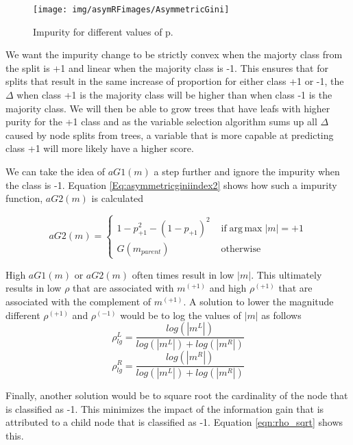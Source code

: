 \begin{figure}
 \centering
\texttt{[image: img/asymRFimages/AsymmetricGini]}\\
 \caption{Impurity for different values of p.}
 \label{Fig:Quantile Regression}
\end{figure}

We want the impurity change to be strictly convex when the majorty class from the split is +1 and linear when the majority class is -1. This ensures that for splits that result in the same increase of proportion for either class +1 or -1, the $\Delta$ when class +1 is the majority class will be higher than when class -1 is the majority class. We will then be able to grow trees that have leafs with higher purity for the +1 class and as the variable selection algorithm sums up all $\Delta$ caused by node splits from trees, a variable that is more capable at predicting class +1 will more likely have a higher score. 

We can take the idea of $aG1(m)$ a step further and ignore the impurity when the class is -1. Equation \ref{Eq:asymmetricginiindex2} shows how such a impurity function, $aG2(m)$ is calculated

\begin{equation}\label{Eq:asymmetricginiindex2}
aG2(m)=
\begin{cases} 1-p_{+1}^2-(1-p_{+1})^2 & \text{ if} \operatorname{arg\,max} |m| = +1 
\\ G(m_{parent})&\text{ otherwise}
\end{cases}
\end{equation}

High $aG1(m)$ or $aG2(m)$ often times result in low $|m|$. This ultimately results in low $\rho$ that are associated with $m^{(+1)}$ and high $\rho^{(+1)}$ that are associated with the complement of $m^{(+1)}$. A solution to lower the magnitude different $\rho^{(+1)}$  and $\rho^{(-1)}$ would be to log the values of $|m|$ as follows
\begin{equation}\label{eqn:rho_log}
	\rho_{lg}^L = \frac{log(|m^L|)}{log(|m^L|)+log(|m^R|)}
\end{equation}
\begin{equation}
	\rho_{lg}^R = \frac{log(|m^R|)}{log(|m^L|)+log(|m^R|)}
\end{equation}


Finally, another solution would be to square root the cardinality of the node that is classified as -1. This minimizes the impact of the information gain that is attributed to a child node that is classified as -1. Equation \ref{eqn:rho_sqrt} shows this.

